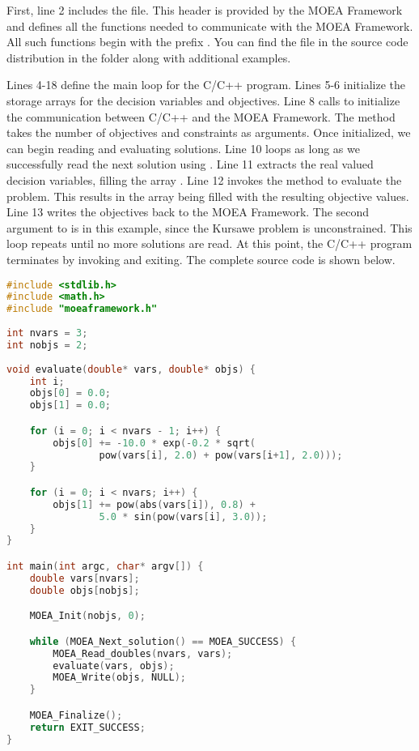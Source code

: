 First, line 2 includes the  file.  This header is provided by the MOEA Framework and defines all the functions needed to communicate with the MOEA Framework.  All such functions begin with the prefix .  You can find the  file in the source code distribution in the folder  along with additional examples.

Lines 4-18 define the main loop for the C/C++ program.  Lines 5-6 initialize the storage arrays for the decision variables and objectives.  Line 8 calls  to initialize the communication between C/C++ and the MOEA Framework.  The  method takes the number of objectives and constraints as arguments.  Once initialized, we can begin reading and evaluating solutions.  Line 10 loops as long as we successfully read the next solution using .  Line 11 extracts the real valued decision variables, filling the array .  Line 12 invokes the  method to evaluate the problem.  This results in the array  being filled with the resulting objective values.  Line 13 writes the objectives back to the MOEA Framework.  The second argument to  is  in this example, since the Kursawe problem is unconstrained.  This loop repeats until no more solutions are read.  At this point, the C/C++ program terminates by invoking  and exiting.  The complete source code is shown below.

\begin{lstlisting}[language=C]
#include <stdlib.h>
#include <math.h>
#include "moeaframework.h"
 
int nvars = 3;
int nobjs = 2;
 
void evaluate(double* vars, double* objs) {
	int i;
	objs[0] = 0.0;
	objs[1] = 0.0;

	for (i = 0; i < nvars - 1; i++) {
		objs[0] += -10.0 * exp(-0.2 * sqrt(
				pow(vars[i], 2.0) + pow(vars[i+1], 2.0)));
	}

	for (i = 0; i < nvars; i++) {
		objs[1] += pow(abs(vars[i]), 0.8) +  
				5.0 * sin(pow(vars[i], 3.0));
	}
}

int main(int argc, char* argv[]) {
	double vars[nvars];
	double objs[nobjs];

	MOEA_Init(nobjs, 0);

	while (MOEA_Next_solution() == MOEA_SUCCESS) {
		MOEA_Read_doubles(nvars, vars);
		evaluate(vars, objs);
		MOEA_Write(objs, NULL);
	}

	MOEA_Finalize();
	return EXIT_SUCCESS;
}
\end{lstlisting}

